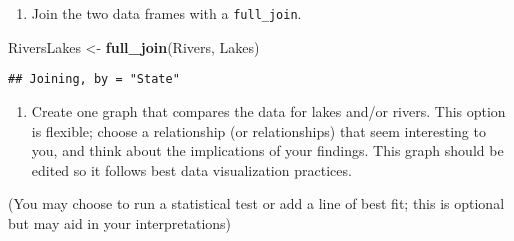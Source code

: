 \documentclass[]{article}
\newenvironment{Shaded}{\begin{snugshade}}{\end{snugshade}}
\newcommand{\KeywordTok}[1]{\textcolor[rgb]{0.13,0.29,0.53}{\textbf{#1}}}
\newcommand{\NormalTok}[1]{#1}
\newcommand{\StringTok}[1]{\textcolor[rgb]{0.31,0.60,0.02}{#1}}
\providecommand{\tightlist}{%
  \setlength{\itemsep}{0pt}\setlength{\parskip}{0pt}}
\begin{document}
\begin{enumerate}
\def\labelenumi{\arabic{enumi}.}
\setcounter{enumi}{9}
\tightlist
\item
  Join the two data frames with a \texttt{full\_join}.
\end{enumerate}

\begin{Shaded}
\begin{Highlighting}[]
\NormalTok{RiversLakes <-}\StringTok{ }\KeywordTok{full_join}\NormalTok{(Rivers, Lakes)}
\end{Highlighting}
\end{Shaded}

\begin{verbatim}
## Joining, by = "State"
\end{verbatim}

\begin{enumerate}
\def\labelenumi{\arabic{enumi}.}
\setcounter{enumi}{10}
\tightlist
\item
  Create one graph that compares the data for lakes and/or rivers. This
  option is flexible; choose a relationship (or relationships) that seem
  interesting to you, and think about the implications of your findings.
  This graph should be edited so it follows best data visualization
  practices.
\end{enumerate}

(You may choose to run a statistical test or add a line of best fit;
this is optional but may aid in your interpretations)
\end{document}
